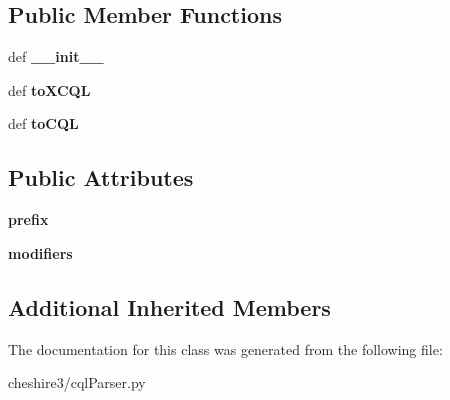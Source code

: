 \subsection*{Public Member Functions}
\begin{DoxyCompactItemize}
\item 
\hypertarget{classcheshire3_1_1cql_parser_1_1_relation_a60425b50270115b578783e95d7479455}{def {\bfseries \-\_\-\-\_\-init\-\_\-\-\_\-}}\label{classcheshire3_1_1cql_parser_1_1_relation_a60425b50270115b578783e95d7479455}

\item 
\hypertarget{classcheshire3_1_1cql_parser_1_1_relation_a385174510cb5d5da895e00f9ce53b349}{def {\bfseries to\-X\-C\-Q\-L}}\label{classcheshire3_1_1cql_parser_1_1_relation_a385174510cb5d5da895e00f9ce53b349}

\item 
\hypertarget{classcheshire3_1_1cql_parser_1_1_relation_a8e3bae382b66887581ded8b0276ed1d4}{def {\bfseries to\-C\-Q\-L}}\label{classcheshire3_1_1cql_parser_1_1_relation_a8e3bae382b66887581ded8b0276ed1d4}

\end{DoxyCompactItemize}
\subsection*{Public Attributes}
\begin{DoxyCompactItemize}
\item 
\hypertarget{classcheshire3_1_1cql_parser_1_1_relation_a43f2cdca24fdc88163f7e298fa5186e3}{{\bfseries prefix}}\label{classcheshire3_1_1cql_parser_1_1_relation_a43f2cdca24fdc88163f7e298fa5186e3}

\item 
\hypertarget{classcheshire3_1_1cql_parser_1_1_relation_aaa8f5947f8ffefdc7b2325ac65d58140}{{\bfseries modifiers}}\label{classcheshire3_1_1cql_parser_1_1_relation_aaa8f5947f8ffefdc7b2325ac65d58140}

\end{DoxyCompactItemize}
\subsection*{Additional Inherited Members}


The documentation for this class was generated from the following file\-:\begin{DoxyCompactItemize}
\item 
cheshire3/cql\-Parser.\-py\end{DoxyCompactItemize}
